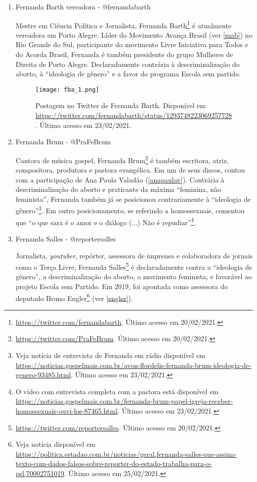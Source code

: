 \documentclass[
	12pt,				%
	openright,			%
	twoside,			%
	a4paper,			%
	english,			%
	brazil				%
	]{abntex2}
\begin{document}
\begin{anexosenv}
\begin{enumerate}
 \item Fernanda Barth vereadora - @fernandabarth
 
 Mestre em Ciência Política e Jornalista, Fernanda Barth\footnote{\url{https://twitter.com/fernandabarth}. Último acesso em 20/02/2021.} é atualmente vereadora em Porto Alegre. Líder do Movimento Avança Brasil (ver \ref{mab}) no Rio Grande do Sul, participante do movimento Livre Iniciativa para Todos e do Acorda Brasil, Fernanda é também presidente do grupo Mulheres de Direita de Porto Alegre. Declaradamente contrária à descriminalização do aborto, à ``ideologia de gênero'' e a favor do programa Escola sem partido.
 
 \begin{figure}[!htbp]
    \centering
    \texttt{[image: fba\_1.png]}
    \caption{Postagem no Twitter de Fernanda Barth. Disponível em \url{https://twitter.com/fernandabarth/status/1293748223069257728}. Último acesso em 23/02/2021.}
 \end{figure}
  
  \newpage
  
 \item Fernanda Brum - @PraFeBrum
 
 Cantora de música gospel, Fernanda Brum\footnote{\url{https://twitter.com/PraFeBrum}. Último acesso em 20/02/2021.} é também escritora, atriz, compositora, produtora e pastora evangélica. Em um de seus discos, contou com a participação de Ana Paula Valadão (\ref{anapaulav}). Contrária à descriminalização do aborto e praticante da máxima ``feminina, não feminista'', Fernanda também já se posicionou contrariamente à ``ideologia de gênero''\footnote{Veja notícia de entrevista de Fernanda em rádio disponível em \url{https://noticias.gospelmais.com.br/avon-flordelis-fernanda-brum-ideologia-de-genero-93485.html}. Último acesso em 23/02/2021.}. Em outro posicionamento, se referindo a homossexuais, comentou que ``o que sara é o amor e o diálogo (...) Não é repudiar''\footnote{O vídeo com entrevista completa com a pastora está disponível em \url{https://noticias.gospelmais.com.br/fernanda-brum-papel-igreja-receber-homossexuais-ouvi-los-87465.html}. Último acesso em 23/02/2021.}.
  
 \item Fernanda Salles - @reportersalles\label{salles}
 
 Jornalista, \textit{youtuber}, repórter, assessora de imprensa e colaboradora de jornais como o Terça Livre, Fernanda Salles\footnote{\url{https://twitter.com/reportersalles}. Último acesso em 20/02/2021.} é declaradamente contra a ``ideologia de gênero'', a descriminalização do aborto, o movimento feminista, e favorável ao projeto Escola sem Partido. Em 2019, foi apontada como assessora do deputado Bruno Engler\footnote{Veja notícia disponível em \url{https://politica.estadao.com.br/noticias/geral,fernanda-salles-que-assina-texto-com-dados-falsos-sobre-reporter-do-estado-trabalha-para-o-psl,70002751019}. Último acesso em 25/02/2021.} (ver \ref{engler}).
 

\end{enumerate}
\end{anexosenv}
\end{document}
